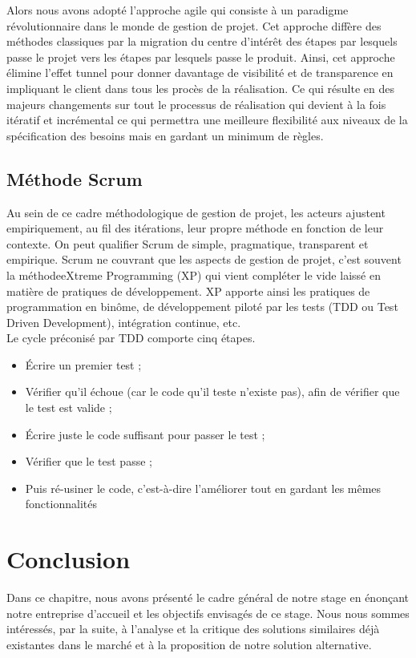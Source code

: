 Alors nous avons adopté l'approche agile qui consiste à un paradigme révolutionnaire dans le monde de gestion de projet. Cet approche diffère des méthodes classiques par la migration du centre d'intérêt des étapes par lesquels passe le projet vers les étapes par lesquels passe le produit. Ainsi, cet approche élimine l'effet tunnel pour donner davantage de visibilité et de transparence en impliquant le client dans  tous les procès de la réalisation. Ce qui résulte en des majeurs changements sur tout le processus de réalisation qui devient à la fois itératif et incrémental ce qui permettra une meilleure flexibilité aux niveaux de la spécification des besoins mais en gardant un minimum de règles.\\

\subsection{Méthode Scrum}

Au sein de ce cadre méthodologique de gestion de projet, les acteurs ajustent empiriquement, au fil des itérations, leur propre méthode en fonction de leur contexte. On peut qualifier Scrum de simple, pragmatique, transparent et empirique. Scrum ne couvrant que les aspects de gestion de projet, c’est souvent la méthodeeXtreme Programming (XP) qui vient compléter le vide laissé en matière de pratiques de développement. XP apporte ainsi les pratiques de programmation en binôme, de développement piloté par les tests (TDD ou Test Driven Development), intégration continue, etc.\\
Le cycle préconisé par TDD comporte cinq étapes.
   \begin{itemize}
   	\item Écrire un premier test ;
   	\item Vérifier qu’il échoue (car le code qu’il teste n’existe pas), afin de vérifier que le test est valide ;
   	\item Écrire juste le code suffisant pour passer le test ;
   	\item Vérifier que le test passe ;
   	\item Puis ré-usiner le code, c’est-à-dire l’améliorer tout en gardant les mêmes fonctionnalités
   \end{itemize}

\section*{Conclusion}

\qquad Dans ce chapitre, nous avons présenté le cadre général de notre stage en énonçant notre entreprise d’accueil et les objectifs envisagés de ce stage. Nous nous sommes intéressés, par la suite, à l’analyse et la critique des solutions similaires déjà existantes dans le marché et à la proposition de notre solution alternative.
